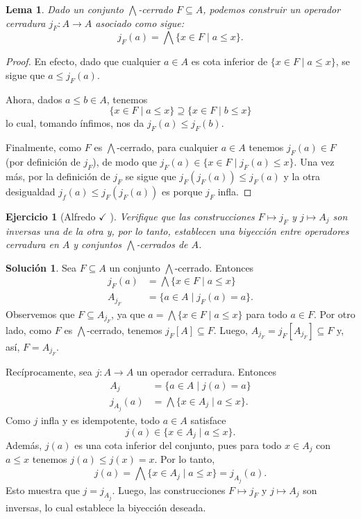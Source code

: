\documentclass[12pt,letterpaper,titlepage]{article}
\newtheorem{exe}{Ejercicio}
\newtheorem*{lemma}{Lema}
\theoremstyle{definition}
\newtheorem*{sol}{Solución}
\newcommand\Inf{\bigwedge}
\newcommand\<{\langle}
\renewcommand\>{\rangle}
\begin{document}
\begin{lemma}
Dado un conjunto $\Inf$-cerrado $F\subseteq A$, podemos construir un
operador cerradura $j_F:A\to A$ asociado como sigue:
\[
    j_F(a) = \Inf\{x\in F \mid a\leq x\}
.\]
\end{lemma}
\begin{proof}
En efecto, dado que cualquier $a\in A$ es cota inferior de
$\{x\in F \mid a\leq x\}$, se sigue que $a\leq j_F(a)$.

Ahora, dados $a\leq b\in A$, tenemos
\[
    \{x\in F \mid a\leq x\} \supseteq \{x\in F \mid b\leq x\}
\]
lo cual, tomando ínfimos, nos da $j_F(a) \leq j_F(b)$.

Finalmente, como $F$ es $\Inf$-cerrado, para cualquier $a\in A$
tenemos $j_F(a)\in F$ (por definición de $j_F$),
de modo que $j_F(a) \in\{x\in F \mid j_F(a) \leq x\}$.
Una vez más, por la definición de $j_F$ se sigue que $j_F(j_F(a)) \leq j_F(a)$
y la otra desigualdad $j_f(a)\leq j_F(j_F(a))$ es porque $j_F$ infla.
\end{proof}
\begin{exe}[Alfredo $\checkmark$ ]
    Verifique que las construcciones $F\mapsto j_F$
    y $j\mapsto A_j$ son inversas una de la otra y, por lo tanto,
    establecen una biyección entre operadores
    cerradura en $A$ y conjuntos $\Inf$-cerrados de $A$.
\end{exe}
\begin{sol}
    Sea $F\subseteq A$ un conjunto $\Inf$-cerrado.
    Entonces
    \begin{align*}
        j_F(a) &= \Inf\{x\in F \mid a\leq x\} \\
        A_{j_F} &= \{a\in A \mid j_F(a)=a\}.
    \end{align*}
    Observemos que $F\subseteq A_{j_F}$, ya que
    $a=\Inf\{x\in F\mid a\leq x\}$ para todo $a\in F$.
    Por otro lado,
    como $F$ es $\Inf$-cerrado, tenemos $j_F[A]\subseteq F$.
    Luego, $A_{j_F}=j_F[A_{j_F}] \subseteq F$ y, así, $F=A_{j_F}$.
    
    Recíprocamente, sea $j:A\to A$ un operador cerradura.
    Entonces
    \begin{align*}
        A_j &= \{a\in A \mid j(a)=a \} \\
        j_{A_j}(a) &= \Inf\{x\in A_j \mid a\leq x\}.
    \end{align*}
    Como $j$ infla y es idempotente, todo $a\in A$ satisface
    \[
        j(a) \in \{x\in A_j \mid a\leq x\}
    .\]
    Además, $j(a)$ es una cota inferior del conjunto,
    pues para todo
    $x\in A_j$ con $a\leq x$ tenemos $j(a)\leq j(x)=x$.
    Por lo tanto,
    \[
        j(a) = \Inf\{x\in A_j \mid a\leq x\} = j_{A_j}(a)
    .\]
    Esto muestra que $j=j_{A_j}$.
    Luego, las construcciones $F\mapsto j_F$ y $j\mapsto A_j$
    son inversas, lo cual establece la biyección deseada.
\end{sol}
\end{document}
